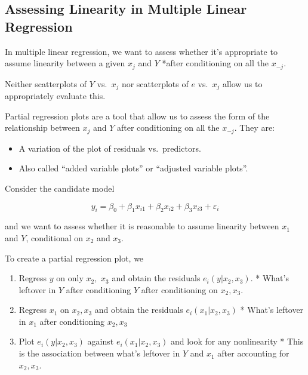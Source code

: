 \documentclass[
  letterpaper,
  DIV=11,
  numbers=noendperiod]{scrreport}
\providecommand{\tightlist}{%
  \setlength{\itemsep}{0pt}\setlength{\parskip}{0pt}}\usepackage{longtable,booktabs,array}
\begin{document}
\hypertarget{assessing-linearity-in-multiple-linear-regression}{%
\subsection{Assessing Linearity in Multiple Linear
Regression}\label{assessing-linearity-in-multiple-linear-regression}}

In multiple linear regression, we want to assess whether it's
appropriate to assume linearity between a given \(x_j\) and \(Y\) *after
conditioning on all the \(x_{-j}\).

Neither scatterplots of \(Y\) vs.~\(x_j\) nor scatterplots of \(e\)
vs.~\(x_j\) allow us to appropriately evaluate this.

{Partial regression plots} are a tool that allow us to assess the form
of the relationship between \(x_j\) and \(Y\) after conditioning on all
the \(x_{-j}\). They are:

\begin{itemize}
\tightlist
\item
  A variation of the plot of residuals vs.~predictors.
\item
  Also called ``added variable plots'' or ``adjusted variable plots''.
\end{itemize}

Consider the candidate model

\[y_i = \beta_0 + \beta_1 x_{i1} + \beta_2 x_{i2} + \beta_3 x_{i3} + \varepsilon_i\]

and we want to assess whether it is reasonable to assume linearity
between \(x_1\) and \(Y\), conditional on \(x_2\) and \(x_3\).

To create a partial regression plot, we

\begin{enumerate}
\def\labelenumi{\arabic{enumi}.}
\tightlist
\item
  Regress \(y\) on only \(x_2,\) \(x_3\) and obtain the residuals
  \(e_i(y|x_2,x_3)\). * What's leftover in \(Y\) after conditioning
  \(Y\) after conditioning on \(x_2, x_3\).
\item
  Regress \(x_1\) on \(x_2, x_3\) and obtain the residuals
  \(e_i(x_1|x_2,x_3)\) * What's leftover in \(x_1\) after conditioning
  \(x_2, x_3\)
\item
  Plot \(e_i(y|x_2,x_3)\) against \(e_i(x_1|x_2,x_3)\) and look for any
  nonlinearity * This is the association between what's leftover in
  \(Y\) and \(x_1\) after accounting for \(x_2,x_3\).
\end{enumerate}
\end{document}
